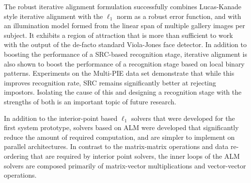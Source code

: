 The robust iterative alignment formulation successfully combines Lucas-Kanade
style iterative alignment with the $\ell_1$ norm as a robust error function,
and with an illumination model formed from the linear span of multiple gallery
images per subject.  It exhibits a region of attraction that is more than
sufficient to work with the output of the de-facto standard Viola-Jones face
detector.  In addition to boosting the performance of a SRC-based recognition
stage, iterative alignment is also shown to boost the performance of a
recognition stage based on local binary patterns.  Experiments on the Multi-PIE
data set demonstrate that while this improves recognition rate, SRC remains
significantly better at rejecting impostors.  Isolating the cause of this and
designing a recognition stage with the strengths of both is an important topic
of future research.

In addition to the interior-point based $\ell_1$ solvers that were developed
for the first system prototype, solvers based on ALM were developed that
significantly reduce the amount of required computation, and are simpler 
to implement on parallel architectures.  In contrast to the matrix-matrix
operations and data re-ordering that are required by interior point solvers,
the inner loops of the ALM solvers are composed primarily of matrix-vector
multiplications and vector-vector operations.

